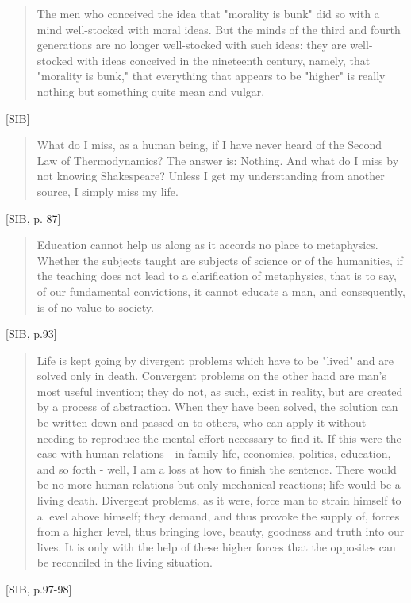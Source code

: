 \begin{quote}
  The men who conceived the idea that "morality is bunk" did so with a mind well-stocked with moral ideas. But the minds of the third and fourth generations are no longer well-stocked with such ideas: they are well-stocked with ideas conceived in the nineteenth century, namely, that "morality is bunk," that everything that appears to be "higher" is really nothing but something quite mean and vulgar.
\end{quote}[SIB]

\begin{quote}
What do I miss, as a human being, if I have never heard of the Second Law of Thermodynamics? The answer is: Nothing. And what do I miss by not knowing Shakespeare? Unless I get my understanding from another source, I simply miss my life.
\end{quote}[SIB, p. 87]

\begin{quote}
  Education cannot help us along as it accords no place to metaphysics. Whether the subjects taught are subjects of science or of the humanities, if the teaching does not lead to a clarification of metaphysics, that is to say, of our fundamental convictions, it cannot educate a man, and consequently, is of no value to society.
\end{quote}[SIB, p.93]

\begin{quote}
  Life is kept going by divergent problems which have to be "lived" and are solved only in death. Convergent problems on the other hand are man's most useful invention; they do not, as such, exist in reality, but are created by a process of abstraction. When they have been solved, the solution can be written down and passed on to others, who can apply it without needing to reproduce the mental effort necessary to find it. If this were the case with human relations - in family life, economics, politics, education, and so forth - well, I am a loss at how to finish the sentence. There would be no more human relations but only mechanical reactions; life would be a living death. Divergent problems, as it were, force man to strain himself to a level above himself; they demand, and thus provoke the supply of, forces from a higher level, thus bringing love, beauty, goodness and truth into our lives. It is only with the help of these higher forces that the opposites can be reconciled in the living situation.
\end{quote} [SIB, p.97-98]


